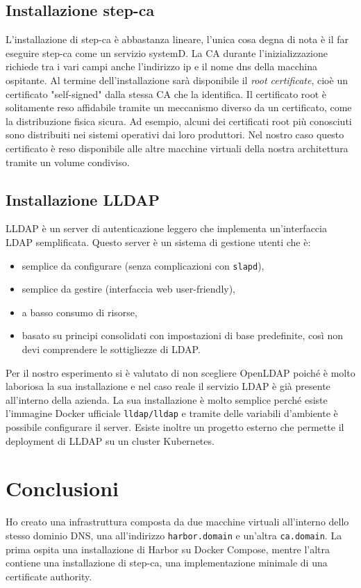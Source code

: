 \documentclass[12pt,a4paper]{report}
\begin{document}
\section{Installazione step-ca}
L'installazione di step-ca è abbastanza lineare, l'unica cosa degna di nota è il far eseguire step-ca come un servizio systemD. La CA durante l'inizializzazione richiede tra i vari campi anche l'indirizzo ip e il nome dns della macchina ospitante. Al termine dell'installazione sarà disponibile il \textit{root certificate}, cioè un certificato "self-signed" dalla stessa CA che la identifica. Il certificato root è solitamente reso affidabile tramite un meccanismo diverso da un certificato, come la distribuzione fisica sicura. Ad esempio, alcuni dei certificati root più conosciuti sono distribuiti nei sistemi operativi dai loro produttori.
Nel nostro caso questo certificato è reso disponibile alle altre macchine virtuali della nostra architettura tramite un volume condiviso.

\section{Installazione LLDAP}
LLDAP è un server di autenticazione leggero che implementa un'interfaccia LDAP semplificata. Questo server è un sistema di gestione utenti che è:
\begin{itemize}
    \item semplice da configurare (senza complicazioni con \texttt{slapd}),
    \item semplice da gestire (interfaccia web user-friendly),
    \item a basso consumo di risorse,
    \item basato su principi consolidati con impostazioni di base predefinite, così non devi comprendere le sottigliezze di LDAP.
\end{itemize}
Per il nostro esperimento si è valutato di non scegliere OpenLDAP poiché è molto laboriosa la sua installazione e nel caso reale il servizio LDAP è già presente all'interno della azienda.
La sua installazione è molto semplice perché esiste l'immagine Docker ufficiale \texttt{lldap/lldap} e tramite delle variabili d'ambiente è possibile configurare il server.
Esiste inoltre un progetto esterno che permette il deployment di LLDAP su un cluster Kubernetes. 

\chapter{Conclusioni}
Ho creato una infrastruttura composta da due macchine virtuali all'interno dello stesso dominio DNS, una all'indirizzo \texttt{harbor.domain} e un'altra \texttt{ca.domain}. La prima ospita una installazione di Harbor su Docker Compose, mentre l'altra contiene una installazione di step-ca, una implementazione minimale di una certificate authority. 
\end{document}
